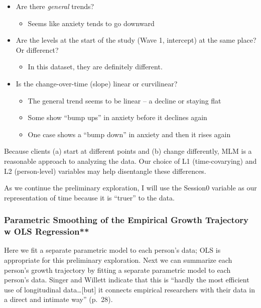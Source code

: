\documentclass[
  english,
]{book}
\providecommand{\tightlist}{%
  \setlength{\itemsep}{0pt}\setlength{\parskip}{0pt}}
\begin{document}
\begin{itemize}
\tightlist
\item
  Are there \emph{general} trends?

  \begin{itemize}
  \tightlist
  \item
    Seems like anxiety tends to go downward
  \end{itemize}
\item
  Are the levels at the start of the study (Wave 1, intercept) at the same place? Or differenct?

  \begin{itemize}
  \tightlist
  \item
    In this dataset, they are definitely different.
  \end{itemize}
\item
  Is the change-over-time (slope) linear or curvilinear?

  \begin{itemize}
  \tightlist
  \item
    The general trend seems to be linear -- a decline or staying flat
  \item
    Some show ``bump ups'' in anxiety before it declines again
  \item
    One case shows a ``bump down'' in anxiety and then it rises again
  \end{itemize}
\end{itemize}

Because clients (a) start at different points and (b) change differently, MLM is a reasonable approach to analyzing the data. Our choice of L1 (time-covarying) and L2 (person-level) variables may help disentangle these differences.

As we continue the preliminary exploration, I will use the Session0 variable as our representation of time because it is ``truer'' to the data.

\hypertarget{parametric-smoothing-of-the-empirical-growth-trajectory-w-ols-regression}{%
\subsubsection{Parametric Smoothing of the Empirical Growth Trajectory w OLS Regression**}\label{parametric-smoothing-of-the-empirical-growth-trajectory-w-ols-regression}}

Here we fit a separate parametric model to each person's data; OLS is appropriate for this preliminary exploration. Next we can summarize each person's growth trajectory by fitting a separate parametric model to each person's data. Singer and Willett \citeyearpar{singer_applied_2003} indicate that this is ``hardly the most efficient use of longitudinal data\ldots{[}but{]} it connects empirical researchers with their data in a direct and intimate way'' (p.~28).
\end{document}
